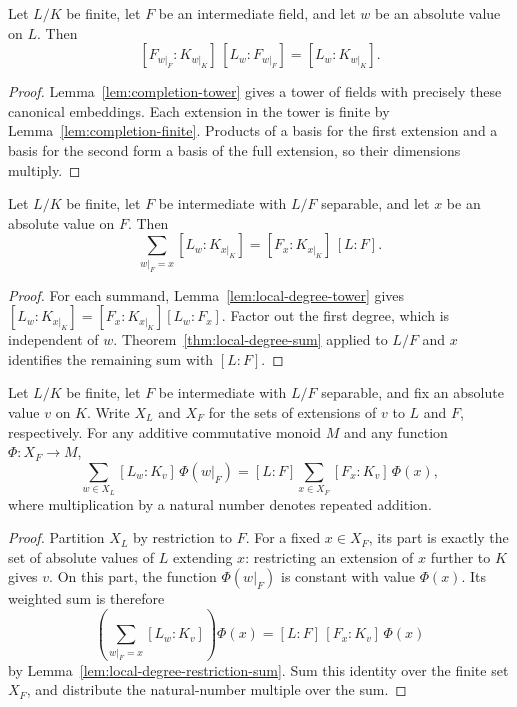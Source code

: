 \begin{lemma}\label{lem:local-degree-tower}
\leanok
{}
Let $L/K$ be finite, let $F$ be an intermediate field, and let $w$
be an absolute value on $L$. Then
\[
 [F_{w|_F}:K_{w|_K}]\,[L_w:F_{w|_F}]
 =[L_w:K_{w|_K}].
\]
\end{lemma}
\begin{proof}
Lemma~\ref{lem:completion-tower} gives a tower of fields with precisely
these canonical embeddings. Each extension in the tower is finite by
Lemma~\ref{lem:completion-finite}. Products of a basis for the first
extension and a basis for the second form a basis of the full
extension, so their dimensions multiply.
\end{proof}

\begin{lemma}
\label{lem:local-degree-restriction-sum}
\leanok
{}
Let $L/K$ be finite, let $F$ be intermediate with $L/F$ separable,
and let $x$ be an absolute value on $F$. Then
\[
 \sum_{w|_F=x}[L_w:K_{x|_K}]
 =[F_x:K_{x|_K}]\,[L:F].
\]
\end{lemma}
\begin{proof}
For each summand, Lemma~\ref{lem:local-degree-tower} gives
$[L_w:K_{x|_K}]=[F_x:K_{x|_K}][L_w:F_x]$.
Factor out the first degree, which is independent of $w$.
Theorem~\ref{thm:local-degree-sum} applied to $L/F$ and $x$
identifies the remaining sum with $[L:F]$.
\end{proof}

\begin{lemma}\label{lem:weighted-restriction-sum}
\leanok
{}
Let $L/K$ be finite, let $F$ be intermediate with $L/F$ separable,
and fix an absolute value $v$ on $K$. Write $X_L$ and $X_F$ for
the sets of extensions of $v$ to $L$ and $F$, respectively.
For any additive commutative monoid $M$ and any function
$\Phi:X_F\to M$,
\[
 \sum_{w\in X_L}[L_w:K_v]\,\Phi(w|_F)
 =[L:F]\sum_{x\in X_F}[F_x:K_v]\,\Phi(x),
\]
where multiplication by a natural number denotes repeated addition.
\end{lemma}
\begin{proof}
Partition $X_L$ by restriction to $F$. For a fixed $x\in X_F$,
its part is exactly the set of absolute values of $L$ extending
$x$: restricting an extension of $x$ further to $K$ gives $v$.
On this part, the function $\Phi(w|_F)$ is constant with value
$\Phi(x)$. Its weighted sum is therefore
\[
 \left(\sum_{w|_F=x}[L_w:K_v]\right)\Phi(x)
 =[L:F]\,[F_x:K_v]\,\Phi(x)
\]
by Lemma~\ref{lem:local-degree-restriction-sum}.
Sum this identity over the finite set $X_F$, and distribute the
natural-number multiple over the sum.
\end{proof}

